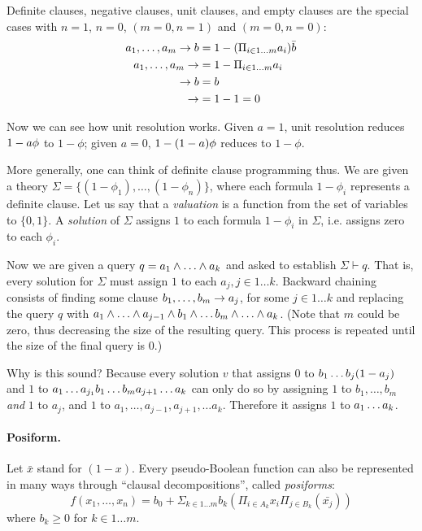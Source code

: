 \documentclass{article} %
\begin{document}
Definite clauses, negative clauses, unit clauses, and empty clauses are the special cases with 
$n=1$, $n=0$, $(m=0,n=1)$ and $(m=0,n=0)$: 
  \begin{align*}
    a_1,\ldots, a_m \rightarrow b &= 1-{(\Pi_{i \in 1\ldots m} a_i)  \bar{b}}\\
    a_1,\ldots, a_m \rightarrow &= 1-{\Pi_{i \in 1\ldots m} a_i}\\
    \rightarrow b &= b\\
    \rightarrow &= 1 - 1 = 0
  \end{align*}

Now we can see how unit resolution works.  Given $a=1$, unit resolution reduces $1-a\phi$ to $1-\phi$; given $a=0$, $1- (1-a) \phi$ reduces to $1-\phi$. 

More generally, one can think of definite clause programming thus. We are given a theory $\Sigma=\{(1-\phi_1),\ldots, (1-\phi_n)\}$, where each formula $1-\phi_i$ represents a definite clause.  
Let us say that a {\em valuation} is a function from the set of variables to $\{0,1\}$. A {\em solution} of $\Sigma$ assigns $1$ to each formula $1-\phi_i$ in $\Sigma$, i.e.{} assigns zero to each $\phi_i$. 

Now we are given a query $q=a_1 \wedge \ldots \wedge a_k$ and asked to establish $\Sigma \vdash q$. That is, every solution for $\Sigma$ must assign $1$ to each $a_j, j\in 1\ldots k$. Backward chaining consists of finding some clause $b_1,\ldots, b_m\rightarrow a_j$, for some $j\in 1\ldots k$ and replacing the query $q$ with $a_1\wedge \ldots \wedge a_{j-1} \wedge b_1 \wedge \ldots b_m \wedge \ldots \wedge a_k$. (Note that $m$ could be zero, thus decreasing the size of the resulting query. This process is repeated until the size of the final query is $0$.)

Why is this sound? Because every solution $v$ that assigns $0$ to $b_1 \ldots  b_j (1-a_j)$ and $1$ to 
$a_1 \ldots  a_{j_1} b_1  \ldots  b_m  a_{j+1} \ldots  a_k$ can only do so by 
assigning $1$ to $b_1, \ldots, b_m$ {\em and} $1$ to $a_j$, and $1$ to $a_1,\ldots, a_{j-1},a_{j+1},\ldots a_k$. Therefore it assigns $1$ to $a_1  \ldots  a_k$. 

\paragraph{Posiform.}
Let $\bar{x}$ stand for $(1-x)$. Every pseudo-Boolean function can also be represented in many ways through ``clausal decompositions'', called {\em posiforms}:
\begin{equation}
  f(x_1,\ldots, x_n)=b_0 + \Sigma_{k \in 1\ldots m} b_k (\Pi_{i\in A_k} x_i \Pi_{j\in B_k}(\bar{x_j}))
\end{equation}
\noindent where $b_k\geq 0$ for $k \in 1\ldots m$. 
\end{document}
